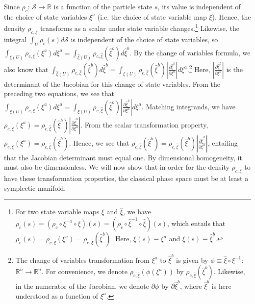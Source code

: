 \documentclass[12pt, english, twoside]{article} %
\begin{document}
Since $\rho_c$: $\mathcal{S} \to \mathbb{R}$ is a function of the particle state $s$, its value is independent of the choice of state variables $\xi^a$ (i.e. the choice of state variable map $\xi$). Hence, the density $\rho_{c, \xi}$ transforms as a scalar under state variable changes.\footnote{For two state variable maps $\xi$ and $\hat{\xi}$, we have $\rho_c(s) = (\rho_c \circ \xi^{-1} \circ \xi)(s) = (\rho_c \circ \hat{\xi}^{-1} \circ \hat{\xi})(s)$, which entails that $\rho_c(s) = \rho_{c, \xi} (\xi^a) = \rho_{c, \hat{\xi}} (\hat{\xi}^b)$. Here, $\xi(s) \equiv \xi^a$ and $\hat{\xi}(s) \equiv \hat{\xi}^b$.} Likewise, the integral $\int_U \rho_c(s) d\mathcal{S} $ is independent of the choice of state variables, so $\int_{\xi(U)} \rho_{c, \xi} (\xi^a) d \xi^a = \int_{\hat{\xi}(U)} \rho_{c, \hat{\xi}} (\hat{\xi}^b) d \hat{\xi}^b$. By the change of variables formula, we also know that $\int_{\hat{\xi}(U)} \rho_{c, \hat{\xi}} (\hat{\xi}^b) d \hat{\xi}^b= \int_{\xi(U)} \rho_{c, \hat{\xi}} (\hat{\xi}^b) \left|\frac{\partial \hat{\xi}^b}{\partial \xi^a} \right|  d \xi^a$.\footnote{The change of variables transformation from $\xi^a$ to $\hat{\xi}^b$ is given by $\phi \equiv \hat{\xi} \circ \xi^{-1}$: $\mathbb{R}^n \to \mathbb{R}^n $. For convenience, we denote $\rho_{c, \hat{\xi}} (\phi(\xi^a))$ by $\rho_{c, \hat{\xi}} (\hat{\xi}^b)$. Likewise, in the numerator of the Jacobian, we denote $\partial \phi$ by $\partial \hat{\xi}^b$, where $\hat{\xi}^b$ is here understood as a function of $\xi^a$.} Here, $ \left|\frac{\partial \hat{\xi}^b}{\partial \xi^a} \right|$ is the determinant of the Jacobian for this change of state variables. From the preceding two equations, we see that $\int_{\xi(U)} \rho_{c, \xi} (\xi^a) d \xi^a = \int_{\xi(U)} \rho_{c, \hat{\xi}} (\hat{\xi}^b) \left|\frac{\partial \hat{\xi}^b}{\partial \xi^a} \right|  d \xi^a$. Matching integrands, we have $\rho_{c, \xi} (\xi^a) = \rho_{c, \hat{\xi}} (\hat{\xi}^b) \left|\frac{\partial \hat{\xi}^b}{\partial \xi^a} \right|$. From the scalar transformation property, $\rho_{c, \xi} (\xi^a) = \rho_{c, \hat{\xi}} (\hat{\xi}^b)$. Hence, we see that $\rho_{c, \hat{\xi}} (\hat{\xi}^b) =  \rho_{c, \hat{\xi}} (\hat{\xi}^b) \left|\frac{\partial \hat{\xi}^b}{\partial \xi^a} \right|$, entailing that the Jacobian determinant must equal one. By dimensional homogeneity, it must also be dimensionless. We will now show that in order for the density $\rho_{c, \xi}$ to have these transformation properties, the classical phase space must be at least a symplectic manifold. 
\end{document}
